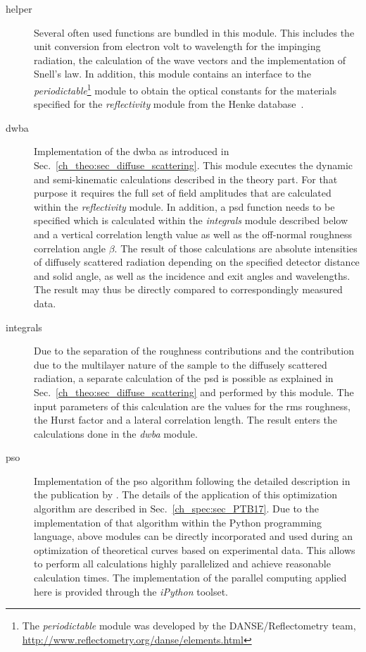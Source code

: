 \begin{description}
 \item[helper]{Several often used functions are bundled in this module. This includes the unit conversion from electron volt to wavelength for the impinging radiation, the calculation of the wave vectors and the implementation of Snell's law. In addition, this module contains an interface to the \emph{periodictable}\footnote{The \emph{periodictable} module was developed by the DANSE/Reflectometry team, \url{http://www.reflectometry.org/danse/elements.html}} module to obtain the optical constants for the materials specified for the \emph{reflectivity} module from the Henke database~\cite{henke_x-ray_1993}.}
 
 \item[dwba]{Implementation of the \gls{dwba} as introduced in Sec.~\ref{ch_theo:sec_diffuse_scattering}. This module executes the dynamic and semi-kinematic calculations described in the theory part. For that purpose it requires the full set of field amplitudes that are calculated within the \emph{reflectivity} module. In addition, a \gls{psd} function needs to be specified which is calculated within the \emph{integrals} module described below and a vertical correlation length value as well as the off-normal roughness correlation angle $\beta$. The result of those calculations are absolute intensities of diffusely scattered radiation depending on the specified detector distance and solid angle, as well as the incidence and exit angles and wavelengths. The result may thus be directly compared to correspondingly measured data.}
 
 \item[integrals]{Due to the separation of the roughness contributions and the contribution due to the multilayer nature of the sample to the diffusely scattered radiation, a separate calculation of the \gls{psd} is possible as explained in Sec.~\ref{ch_theo:sec_diffuse_scattering} and performed by this module. The input parameters of this calculation are the values for the \gls{rms} roughness, the Hurst factor and a lateral correlation length. The result enters the calculations done in the \emph{dwba} module.}
 
 \item[pso]{Implementation of the \gls{pso} algorithm following the detailed description in the publication by \textcite{carlisle_off--shelf_2001}. The details of the application of this optimization algorithm are described in Sec.~\ref{ch_spec:sec_PTB17}. Due to the implementation of that algorithm within the Python programming language, above modules can be directly incorporated and used during an optimization of theoretical curves based on experimental data. This allows to perform all calculations highly parallelized and achieve reasonable calculation times. The implementation of the parallel computing applied here is provided through the \emph{iPython} toolset.}
 

\end{description}
